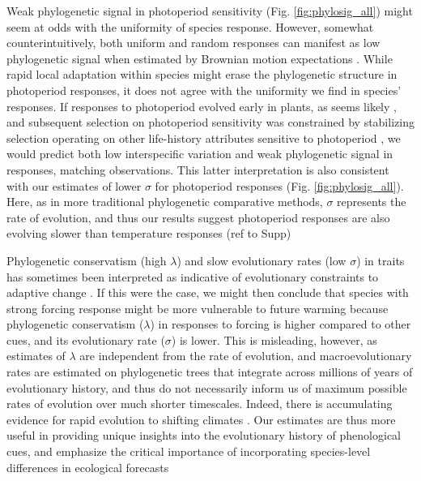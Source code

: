 \documentclass[11pt]{article}
\begin{document}
Weak phylogenetic signal in photoperiod sensitivity (Fig. \ref{fig:phylosig_all}) might seem at odds with the uniformity of species response. However, somewhat counterintuitively, both uniform and random responses can manifest as low phylogenetic signal when estimated by Brownian motion expectations \citep{wiens2010niche}. While rapid local adaptation within species might erase the phylogenetic structure in photoperiod responses, it does not agree with the uniformity we find in species' responses. If responses to photoperiod evolved early in plants, as seems likely \citep{serrano2017}, and subsequent selection on photoperiod sensitivity was constrained by stabilizing selection operating on other life-history attributes sensitive to photoperiod \citep[e.g.,][]{Rinne:1994,Wilczek2014,azeez2015}, we would predict both low interspecific variation and weak phylogenetic signal in responses, matching observations. This latter interpretation is also consistent with our estimates of lower $\sigma$ for photoperiod responses (Fig. \ref{fig:phylosig_all}). Here, as in more traditional phylogenetic comparative methods, $\sigma$ represents the rate of evolution, and thus our results suggest photoperiod responses are also evolving slower than temperature responses (ref to Supp)


Phylogenetic conservatism (high $\lambda$) and slow evolutionary rates (low $\sigma$) in traits has sometimes been interpreted as indicative of evolutionary constraints to adaptive change \citep{wiens2010niche,bennett2021evolution}. If this were the case, we might then conclude that species with strong forcing response might be more vulnerable to future warming because phylogenetic conservatism ($\lambda$) in responses to forcing is higher compared to other cues, and its evolutionary rate ($\sigma$) is lower. This is misleading, however, as estimates of $\lambda$ are independent from the rate of evolution, and macroevolutionary rates are estimated on phylogenetic trees that integrate across millions of years of evolutionary history, and thus do not necessarily inform us of maximum possible rates of evolution over much shorter timescales. Indeed, there is accumulating evidence for rapid evolution to shifting climates \citep{bradshaw2006,franks2014}. Our estimates are thus more useful in providing unique insights into the evolutionary history of phenological cues, and emphasize the critical importance of incorporating species-level differences in ecological forecasts
\end{document}
